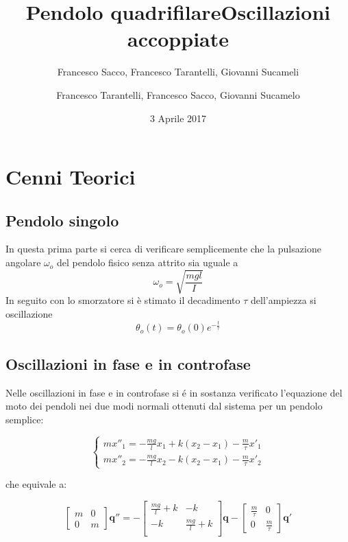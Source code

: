 \documentclass{exam}
\date{3 Aprile 2017}
\title{Pendolo quadrifilare}
\author{Francesco Sacco, Francesco Tarantelli, Giovanni Sucameli}
\author{Francesco Tarantelli, Francesco Sacco, Giovanni Sucamelo}
\title{Oscillazioni accoppiate}
\begin{document}
	\maketitle



	\section{Cenni Teorici}
		\subsection{Pendolo singolo}
			In questa prima parte si cerca di verificare semplicemente che la pulsazione angolare $\omega_o$ del pendolo fisico senza attrito sia uguale a 
			\begin{equation}
				\omega_o=\sqrt{\frac{mgl}{I}}
			\end{equation}
			In seguito con lo smorzatore si è stimato il decadimento $\tau $ dell'ampiezza si oscillazione
			\begin{equation}
				\theta_o(t)=\theta_o(0)e^{-\frac{t}{\tau}}
			\end{equation}
	\subsection{Oscillazioni in fase e in controfase}
		Nelle oscillazioni in fase e in controfase si \'e in sostanza verificato l'equazione del moto dei pendoli nei due modi normali ottenuti dal sistema per un pendolo semplice:

		\[
			\begin{cases} 
				m x''_1=-\frac{mg}{l}x_1 + k(x_2-x_1) -\frac{m}{\tau} x'_1 \\
				m x''_2=-\frac{mg}{l}x_2 -  k(x_2-x_1) - \frac{m}{\tau} x'_2
			\end{cases}
		\]

		che equivale a:

		\[
			\begin{bmatrix}
				m & 0 \\
				0 & m
			\end{bmatrix}
			\mathbf{q''}=-
			\begin{bmatrix}
				\frac{mg}{l} + k & -k \\
				-k & \frac{mg}{l} + k \\
			\end{bmatrix}
			\mathbf{q} -
			\begin{bmatrix}
				\frac{m}{\tau} & 0 \\
				0 & \frac{m}{\tau} 
			\end{bmatrix}
			\mathbf{q'} 
		\]
\end{document}
